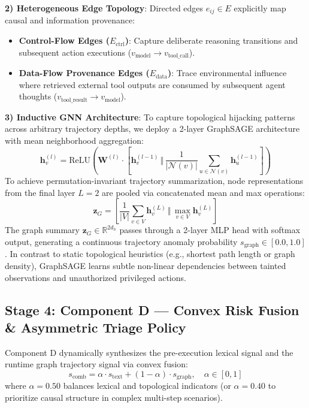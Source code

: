\documentclass[conference]{IEEEtran}
\begin{document}
\textbf{2) Heterogeneous Edge Topology}: Directed edges $e_{ij} \in E$ explicitly map causal and information provenance:
\begin{itemize}
    \item \textbf{Control-Flow Edges ($E_{\text{ctrl}}$)}: Capture deliberate reasoning transitions and subsequent action executions ($v_{\text{model}} \rightarrow v_{\text{tool\_call}}$).
    \item \textbf{Data-Flow Provenance Edges ($E_{\text{data}}$)}: Trace environmental influence where retrieved external tool outputs are consumed by subsequent agent thoughts ($v_{\text{tool\_result}} \rightarrow v_{\text{model}}$).
\end{itemize}

\textbf{3) Inductive GNN Architecture}: To capture topological hijacking patterns across arbitrary trajectory depths, we deploy a 2-layer GraphSAGE architecture with mean neighborhood aggregation:
\begin{equation}
    \mathbf{h}_v^{(l)} = \text{ReLU}\left(\mathbf{W}^{(l)} \cdot \left[ \mathbf{h}_v^{(l-1)} \,\Vert\, \frac{1}{|\mathcal{N}(v)|} \sum_{u \in \mathcal{N}(v)} \mathbf{h}_u^{(l-1)} \right]\right)
\end{equation}
To achieve permutation-invariant trajectory summarization, node representations from the final layer $L=2$ are pooled via concatenated mean and max operations:
\begin{equation}
    \mathbf{z}_G = \left[ \frac{1}{|V|} \sum_{v \in V} \mathbf{h}_v^{(L)} \,\Vert\, \max_{v \in V} \mathbf{h}_v^{(L)} \right]
\end{equation}
The graph summary $\mathbf{z}_G \in \mathbb{R}^{2d_h}$ passes through a 2-layer MLP head with softmax output, generating a continuous trajectory anomaly probability $s_{\text{graph}} \in [0.0, 1.0]$. In contrast to static topological heuristics (e.g., shortest path length or graph density), GraphSAGE learns subtle non-linear dependencies between tainted observations and unauthorized privileged actions.

\subsection{Stage 4: Component D — Convex Risk Fusion \& Asymmetric Triage Policy}
Component D dynamically synthesizes the pre-execution lexical signal and the runtime graph trajectory signal via convex fusion:
\begin{equation}
    s_{\text{comb}} = \alpha \cdot s_{\text{text}} + (1 - \alpha) \cdot s_{\text{graph}}, \quad \alpha \in [0, 1]
\end{equation}
where $\alpha = 0.50$ balances lexical and topological indicators (or $\alpha = 0.40$ to prioritize causal structure in complex multi-step scenarios).
\end{document}
